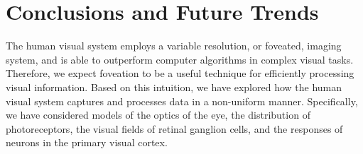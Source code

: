 \documentclass{article}
\begin{document}
\section{Conclusions and Future Trends}

The human visual system employs a variable resolution, or foveated, imaging system, and is able to outperform computer algorithms in complex visual tasks.
Therefore, we expect foveation to be a useful technique for efficiently processing visual information.
Based on this intuition, we have explored how the human visual system captures and processes data in a non-uniform manner.
Specifically, we have considered models of the optics of the eye, the distribution of photoreceptors, the visual fields of retinal ganglion cells, and the responses of neurons in the primary visual cortex.


\end{document}
